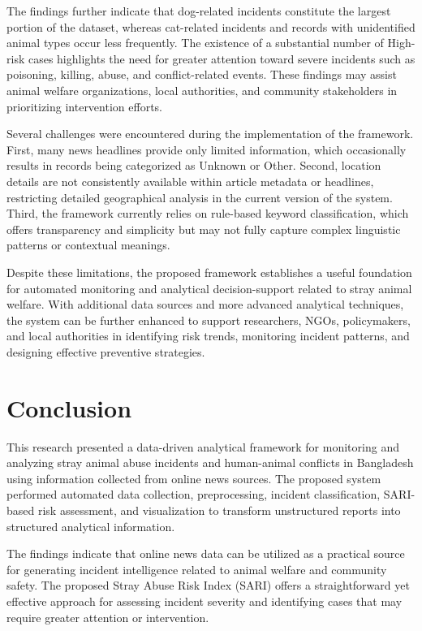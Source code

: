 \documentclass[conference]{IEEEtran}
\begin{document}
The findings further indicate that dog-related incidents constitute the largest portion of the dataset, whereas cat-related incidents and records with unidentified animal types occur less frequently. The existence of a substantial number of High-risk cases highlights the need for greater attention toward severe incidents such as poisoning, killing, abuse, and conflict-related events. These findings may assist animal welfare organizations, local authorities, and community stakeholders in prioritizing intervention efforts.

Several challenges were encountered during the implementation of the framework. First, many news headlines provide only limited information, which occasionally results in records being categorized as Unknown or Other. Second, location details are not consistently available within article metadata or headlines, restricting detailed geographical analysis in the current version of the system. Third, the framework currently relies on rule-based keyword classification, which offers transparency and simplicity but may not fully capture complex linguistic patterns or contextual meanings.

Despite these limitations, the proposed framework establishes a useful foundation for automated monitoring and analytical decision-support related to stray animal welfare. With additional data sources and more advanced analytical techniques, the system can be further enhanced to support researchers, NGOs, policymakers, and local authorities in identifying risk trends, monitoring incident patterns, and designing effective preventive strategies.

\section{Conclusion}

This research presented a data-driven analytical framework for monitoring and analyzing stray animal abuse incidents and human-animal conflicts in Bangladesh using information collected from online news sources. The proposed system performed automated data collection, preprocessing, incident classification, SARI-based risk assessment, and visualization to transform unstructured reports into structured analytical information.

The findings indicate that online news data can be utilized as a practical source for generating incident intelligence related to animal welfare and community safety. The proposed Stray Abuse Risk Index (SARI) offers a straightforward yet effective approach for assessing incident severity and identifying cases that may require greater attention or intervention.
\end{document}
